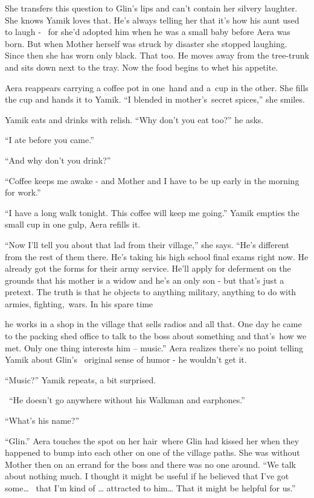 \documentclass[twoside,11pt]{book}
\begin{document}
She transfers this question to Glin's lips and can't contain her silvery laughter. She knows Yamik loves that. He's
always telling her that it's how his aunt used to laugh - \ for she'd adopted him when he was a small baby before Aera
was born. But when Mother herself was struck by disaster she stopped laughing. Since then she has worn only black. That
too. He moves away from the tree-trunk and sits down next to the tray. Now the food begins to whet his appetite.

Aera reappears carrying a coffee pot in one~hand and a~cup in the other. She fills the cup and hands it to Yamik. ``I
blended in mother's~secret spices,'' she smiles.~

Yamik eats and drinks with relish. ``Why don't you eat too?'' he asks.

{}``I ate before you came.''

{}``And why don't you drink?''

{}``Coffee keeps me awake - and Mother and I have to be up early in the morning for work.''

{}``I have a long walk tonight. This coffee will keep me going.'' Yamik empties the small cup in one gulp, Aera refills
it.

{}``Now I'll tell you about that lad from their village,'' she says. ``He's different from the rest of them there. He's
taking his high school final exams right now. He already got the forms for their army service. He'll apply for
deferment on the grounds that his mother is a widow and he's an only son - but that's just a pretext. The truth is that
he objects to anything military, anything to do with armies, fighting,~wars. In his spare time

he works in a shop in the village that sells radios and all that. One day he came to the packing shed office to talk to
the boss about something and that's~how we met. Only one thing interests him -- music.'' Aera realizes there's no point
telling Yamik about Glin's {\ }original{ }sense of humor - he wouldn't get it.

{}``Music?'' Yamik repeats, a bit surprised.

~``He doesn't go anywhere without his Walkman and earphones.''

{}``What's his name?''

{}``Glin.'' Aera touches the spot on her hair~where Glin had kissed her when they happened to bump into each other on
one of the village paths. She was without Mother then on an errand for the boss and there was no one around. ``We talk
about nothing much. I thought it might be useful if he believed that I've got some{\dots} \ that I'm kind of {\dots}
attracted to him{\dots} That it might be helpful for us.''
\end{document}
